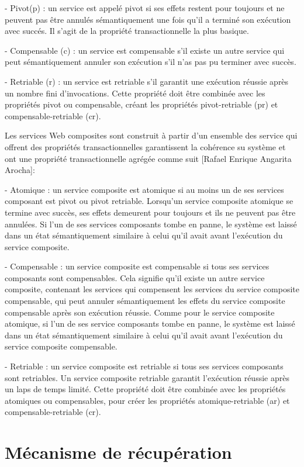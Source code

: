  - Pivot(p) : un service est appelé pivot si ses effets restent pour toujours
et ne peuvent pas être annulés sémantiquement une fois qu’il a terminé son exécution avec succés. Il s’agit de la propriété transactionnelle la plus basique.

- Compensable (c) : un service est compensable s’il existe un autre service qui peut sémantiquement annuler son exécution s'il n'as pas pu terminer avec succès.  
 
- Retriable (r) : un service est retriable s’il garantit une exécution réussie après un nombre fini d’invocations. Cette propriété doit être combinée avec les propriétés pivot ou compensable, créant les propriétés pivot-retriable (pr) et compensable-retriable (cr).

Les services Web composites sont construit à partir d'un ensemble des service qui offrent des propriétés transactionnelles garantissent la cohérence su système et ont une propriété transactionnelle agrégée comme suit [Rafael Enrique Angarita Arocha]: 

- Atomique : un service composite est atomique si au moins un de ses services composant est pivot ou pivot retriable. Lorsqu’un service composite atomique se termine avec succès, ses effets demeurent pour toujours et ils ne peuvent pas être annulées. Si l’un de ses services composants tombe en panne, le système est laissé dans un état sémantiquement similaire à celui qu’il avait avant l’exécution du service composite.


- Compensable : un service composite est compensable si tous ses services composants sont compensables. Cela signifie qu’il existe un autre service composite, contenant les services qui compensent les services du service composite compensable, qui peut annuler sémantiquement les effets du service composite compensable après son exécution réussie. Comme pour le service composite atomique, si l’un de ses service composants tombe en panne, le système est laissé dans un état sémantiquement similaire à celui qu’il avait avant l’exécution du service composite compensable.


- Retriable : un service composite est retriable si tous ses services composants sont retriables. Un service composite retriable garantit l’exécution réussie après un laps de temps limité. Cette propriété doit être combinée avec les propriétés atomiques ou compensables, pour créer les propriétés atomique-retriable (ar) et compensable-retriable (cr).


\section{Mécanisme de récupération}

